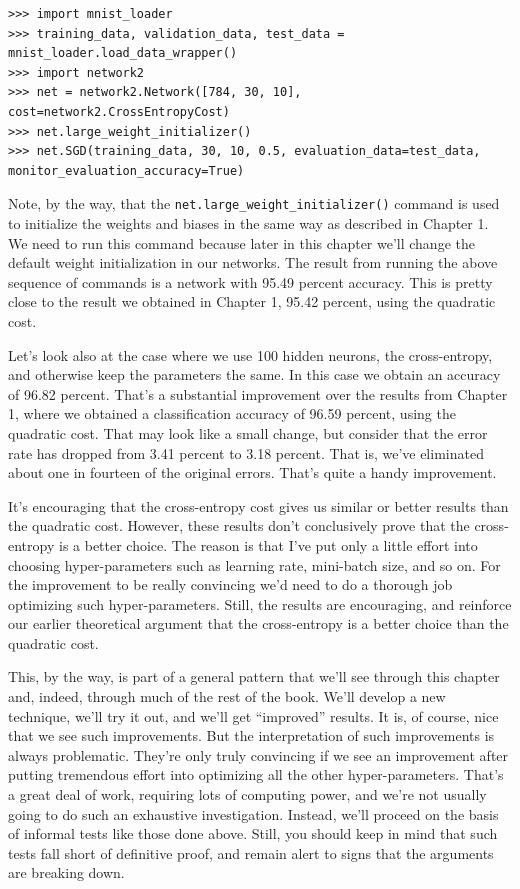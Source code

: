 \documentclass[a4paper,twoside,10pt]{book}
\begin{document}
\begin{lstlisting}
>>> import mnist_loader
>>> training_data, validation_data, test_data = mnist_loader.load_data_wrapper()
>>> import network2
>>> net = network2.Network([784, 30, 10], cost=network2.CrossEntropyCost)
>>> net.large_weight_initializer()
>>> net.SGD(training_data, 30, 10, 0.5, evaluation_data=test_data, monitor_evaluation_accuracy=True)
\end{lstlisting}	
Note, by the way, that the \texttt{net.large\_weight\_initializer()} command is used to initialize the weights and biases in the same way as described in Chapter 1. We need to run this command because later in this chapter we'll change the default weight initialization in our networks. The result from running the above sequence of commands is a network with 95.49 percent accuracy. This is pretty close to the result we obtained in Chapter 1, 95.42 percent, using the quadratic cost.
	
Let's look also at the case where we use 100 hidden neurons, the cross-entropy, and otherwise keep the parameters the same. In this case we obtain an accuracy of 96.82 percent. That's a substantial improvement over the results from Chapter 1, where we obtained a classification accuracy of 96.59 percent, using the quadratic cost. That may look like a small change, but consider that the error rate has dropped from 3.41 percent to 3.18 percent. That is, we've eliminated about one in fourteen of the original errors. That's quite a handy improvement.
	
It's encouraging that the cross-entropy cost gives us similar or better results than the quadratic cost. However, these results don't conclusively prove that the cross-entropy is a better choice. The reason is that I've put only a little effort into choosing hyper-parameters such as learning rate, mini-batch size, and so on. For the improvement to be really convincing we'd need to do a thorough job optimizing such hyper-parameters. Still, the results are encouraging, and reinforce our earlier theoretical argument that the cross-entropy is a better choice than the quadratic cost.
	
This, by the way, is part of a general pattern that we'll see through this chapter and, indeed, through much of the rest of the book. We'll develop a new technique, we'll try it out, and we'll get ``improved'' results. It is, of course, nice that we see such improvements. But the interpretation of such improvements is always problematic. They're only truly convincing if we see an improvement after putting tremendous effort into optimizing all the other hyper-parameters. That's a great deal of work, requiring lots of computing power, and we're not usually going to do such an exhaustive investigation. Instead, we'll proceed on the basis of informal tests like those done above. Still, you should keep in mind that such tests fall short of definitive proof, and remain alert to signs that the arguments are breaking down.
	
\end{document}

